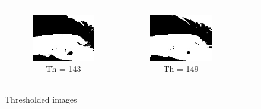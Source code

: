 \begin{figure}[htbp]
\begin{tabular}{cccc}
\begin{subfigure}{0.2\linewidth}
    \includegraphics[width=\linewidth]{plots/thresholding/th14}
    \caption{Th = 143}
    \end{subfigure} &
    \begin{subfigure}{0.2\linewidth}
    \centering
    \includegraphics[width=\linewidth]{plots/thresholding/th15}
    \caption{Th = 149}
    \end{subfigure} \\
    \end{tabular}
    \caption{Thresholded images}
    \label{fig:thresholded_images}
    \end{figure}


